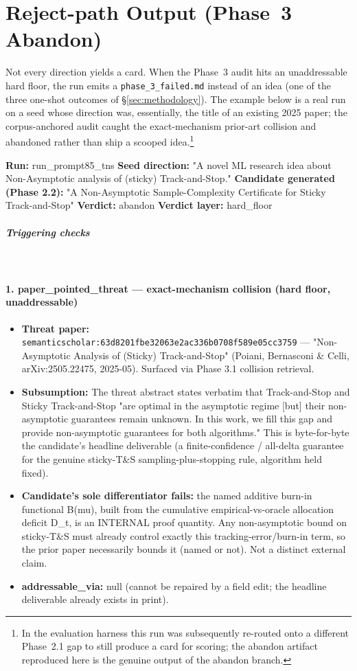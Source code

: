 \section{Reject-path Output (Phase~3 Abandon)}
\label{app:reject}
Not every direction yields a card. When the Phase~3 audit hits an unaddressable hard floor, the run
emits a \texttt{phase\_3\_failed.md} instead of an idea (one of the three one-shot outcomes of
\S\ref{sec:methodology}). The example below is a real run on a seed whose direction was, essentially,
the title of an existing 2025 paper; the corpus-anchored audit caught the exact-mechanism prior-art
collision and abandoned rather than ship a scooped idea.\footnote{In the evaluation harness this run
was subsequently re-routed onto a different Phase~2.1 gap to still produce a card for scoring; the
abandon artifact reproduced here is the genuine output of the abandon branch.}

\begingroup\small

\textbf{Run:} run\_prompt85\_tns
\textbf{Seed direction:} "A novel ML research idea about Non-Asymptotic analysis of (sticky) Track-and-Stop."
\textbf{Candidate generated (Phase 2.2):} "A Non-Asymptotic Sample-Complexity Certificate for Sticky Track-and-Stop"
\textbf{Verdict:} abandon
\textbf{Verdict layer:} hard\_floor

\subparagraph{\textbf{Triggering checks}}\

\paragraph{1. paper\_pointed\_threat --- exact-mechanism collision (hard floor, unaddressable)}
\begin{itemize}[leftmargin=*]
\item \textbf{Threat paper:} \texttt{semanticscholar:63d8201fbe32063e2ac336b0708f589e05cc3759} --- "Non-Asymptotic Analysis of (Sticky) Track-and-Stop" (Poiani, Bernasconi \& Celli, arXiv:2505.22475, 2025-05). Surfaced via Phase 3.1 collision retrieval.
\item \textbf{Subsumption:} The threat abstract states verbatim that Track-and-Stop and Sticky Track-and-Stop "are optimal in the asymptotic regime [but] their non-asymptotic guarantees remain unknown. In this work, we fill this gap and provide non-asymptotic guarantees for both algorithms." This is byte-for-byte the candidate's headline deliverable (a finite-confidence / all-delta guarantee for the genuine sticky-T\&S sampling-plus-stopping rule, algorithm held fixed).
\item \textbf{Candidate's sole differentiator fails:} the named additive burn-in functional B(mu), built from the cumulative empirical-vs-oracle allocation deficit D\_t, is an INTERNAL proof quantity. Any non-asymptotic bound on sticky-T\&S must already control exactly this tracking-error/burn-in term, so the prior paper necessarily bounds it (named or not). Not a distinct external claim.
\item \textbf{addressable\_via:} null (cannot be repaired by a field edit; the headline deliverable already exists in print).
\end{itemize}

